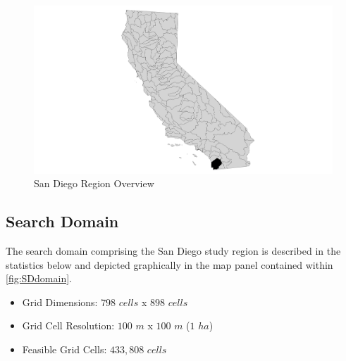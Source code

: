        \begin{figure}[!h]
            \begin{center}
            \includegraphics[width=5.5in]{figures/SanDiego_Overview.png}   
            \caption{San Diego Region Overview}
            \label{fig:SDoverview}
            \end{center}
        \end{figure}

    \subsection{Search Domain}
    
    The search domain comprising the San Diego study region is described in the statistics below and depicted graphically in the map panel contained within \ref{fig:SDdomain}.
        
    \begin{itemize}
      \setlength{\itemsep}{0cm}
      \setlength{\parskip}{0cm}
        \item Grid Dimensions: $798$ $cells$ x $898$ $cells$
        \item Grid Cell Resolution: $100$ $m$ x $100$ $m$ ($1$ $ha$)
        \item Feasible Grid Cells: $433,808$ $cells$
    \end{itemize}
    

